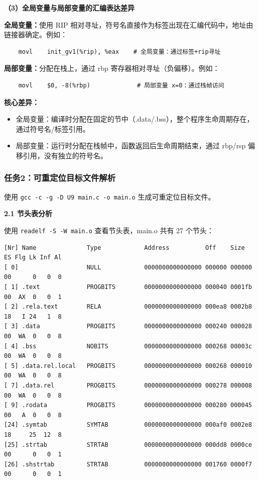 \documentclass[12pt,a4paper]{ctexart}
\begin{document}
\textbf{（3）全局变量与局部变量的汇编表达差异}

\textbf{全局变量：}使用 RIP 相对寻址，符号名直接作为标签出现在汇编代码中，地址由链接器确定。例如：

\begin{lstlisting}
    movl    init_gv1(%rip), %eax    # 全局变量：通过标签+rip寻址
\end{lstlisting}

\textbf{局部变量：}分配在栈上，通过 rbp 寄存器相对寻址（负偏移）。例如：

\begin{lstlisting}
    movl    $0, -8(%rbp)             # 局部变量 x=0：通过栈帧访问
\end{lstlisting}

\textbf{核心差异：}
\begin{itemize}[nosep]
    \item 全局变量：编译时分配在固定的节中（.data/.bss），整个程序生命周期存在，通过符号名/标签引用。
    \item 局部变量：运行时分配在栈帧中，函数返回后生命周期结束，通过 rbp/rsp 偏移引用，没有独立的符号名。
\end{itemize}

\subsubsection*{任务2：可重定位目标文件解析}

使用 \texttt{gcc -c -g -D U9 main.c -o main.o} 生成可重定位目标文件。

\textbf{2.1 节头表分析}

使用 \texttt{readelf -S -W main.o} 查看节头表，main.o 共有 27 个节头：

\begin{lstlisting}
[Nr] Name              Type            Address          Off    Size   ES Flg Lk Inf Al
[ 0]                   NULL            0000000000000000 000000 000000 00      0   0  0
[ 1] .text             PROGBITS        0000000000000000 000040 0001fb 00  AX  0   0  1
[ 2] .rela.text        RELA            0000000000000000 000ea8 0002b8 18   I 24   1  8
[ 3] .data             PROGBITS        0000000000000000 000240 000028 00  WA  0   0  8
[ 4] .bss              NOBITS          0000000000000000 000268 00003c 00  WA  0   0  8
[ 5] .data.rel.local   PROGBITS        0000000000000000 000268 000010 00  WA  0   0  8
[ 7] .data.rel         PROGBITS        0000000000000000 000278 000008 00  WA  0   0  8
[ 9] .rodata           PROGBITS        0000000000000000 000280 000045 00   A  0   0  8
[24] .symtab           SYMTAB          0000000000000000 000af0 0002e8 18     25  12  8
[25] .strtab           STRTAB          0000000000000000 000dd8 0000ce 00      0   0  1
[26] .shstrtab         STRTAB          0000000000000000 001760 0000f7 00      0   0  1
\end{lstlisting}
\end{document}
